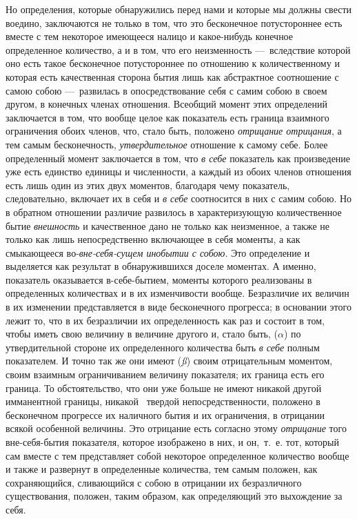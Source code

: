Но определения, которые обнаружились перед нами и которые мы должны свести
воедино, заключаются не только в том, что это бесконечное потустороннее
есть вместе с тем некоторое имеющееся налицо и какое-нибудь конечное
определенное количество, а и в том, что его неизменность —~вследствие
которой оно есть такое бесконечное потустороннее по отношению к
количественному и которая есть качественная сторона бытия лишь как
абстрактное соотношение с самою собою —~развилась в опосредствование себя с
самим собою в своем другом, в конечных членах отношения. Всеобщий момент
этих определений заключается в том, что вообще целое как показатель есть
граница взаимного ограничения обоих членов, что, стало быть, положено
{\em отрицание отрицания}, а тем самым бесконечность,
{\em утвердительное} отношение к самому себе. Более
определенный момент заключается в том, что {\em в себе}
показатель как произведение уже есть единство единицы и численности, а
каждый из обоих членов отношения есть лишь один из этих двух моментов,
благодаря чему показатель, следовательно, включает их в себя и
{\em в себе} соотносится в них с самим собою. Но в
обратном отношении различие развилось в характеризующую количественное
бытие {\em внешность} и качественное дано не только как
неизменное, а также не только как лишь непосредственно включающее в себя
моменты, а как смыкающееся во-{\em вне-себя-сущем
инобытии с собою}. Это определение и выделяется как результат в
обнаружившихся доселе моментах. А именно, показатель оказывается
в-себе-бытием, моменты которого реализованы в определенных количествах и в
их изменчивости вообще. Безразличие их величин в их изменении
представляется в виде бесконечного прогресса; в основании этого лежит то,
что в их безразличии их определенность как раз и состоит в том, чтобы иметь
свою величину в величине другого и, стало быть,
({\em $\alpha $}) по утвердительной стороне их
определенного количества быть {\em в себе} полным
показателем. И точно так же они имеют ({\em ß}) своим
отрицательным моментом, своим взаимным ограничиванием величину показателя;
их граница есть его граница. То обстоятельство, что они уже больше не имеют
никакой другой имманентной границы,
никакой~
твердой непосредственности, положено в бесконечном прогрессе их наличного
бытия и их ограничения, в отрицании всякой особенной величины. Это
отрицание есть согласно этому {\em отрицание} того
вне-себя-бытия показателя, которое изображено в них, и он,~т.~е. тот,
который сам вместе с тем представляет собой некоторое определенное
количество вообще и также и развернут в определенные количества, тем самым
положен, как сохраняющийся, сливающийся с собою в отрицании их
безразличного существования, положен, таким образом, как определяющий это
выхождение за себя.

